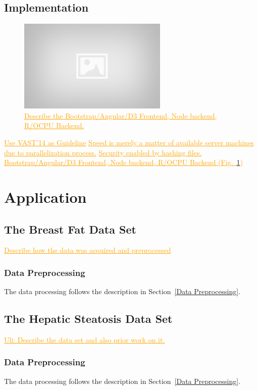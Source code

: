 \documentclass[journal]{style/vgtc} 			          %
\newcommand{\com}[1]{\textcolor{orange}{\uline{#1}}}
\begin{document}
\subsection{Implementation} \label{implementation}
\begin{figure}[htb]
 \centering
 \includegraphics[width=2.8in]{figures/placeholder}
 \caption{
 \com{Describe the Bootstrap/Angular/D3 Frontend, Node backend, R/OCPU Backend.}
 }
  \label{fig:Implementation}
\end{figure}
\com{Use VAST'14 as Guideline}
\com{Speed is merely a matter of available server machines due to parallelization process.}
\com{Security enabled by hashing files.}
\com{Bootstrap/Angular/D3 Frontend, Node backend, R/OCPU Backend (Fig.~\ref{fig:Implementation})}

\section{Application} \label{application}
%
\subsection{The Breast Fat Data Set}
\com{Describe how the data was acquired and preprocessed}

\subsubsection{Data Preprocessing} \label{application:Data Preprocessing}
The data processing follows the description in Section~\ref{Data Preprocessing}.
%

\subsection{The Hepatic Steatosis Data Set}
\com{Uli: Describe the data set and also prior work on it.}

\subsubsection{Data Preprocessing} \label{application:Data Preprocessing}
The data processing follows the description in Section~\ref{Data Preprocessing}.
%
\end{document}
